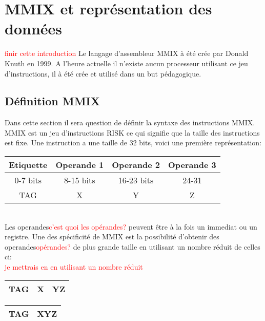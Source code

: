\documentclass {article}
\theoremstyle{definition}
\theoremstyle{remark}
\newcommand{\todo}[1]{\textcolor{red}{#1}}
\begin{document}
\section{MMIX et représentation des données}
\label{partieMMIX}

\todo{finir cette introduction}
Le langage d'assembleur MMIX à été crée par Donald Knuth en 1999.
A l'heure actuelle il n'existe aucun processeur utilisant ce jeu d'instructions, il
à été crée et utilisé dans un but pédagogique.



\subsection{Définition MMIX}

Dans cette section il sera question de définir la syntaxe des instructions MMIX.
MMIX est un jeu d'instructions RISK ce qui signifie que la taille des instructions
est fixe. Une instruction a une taille de 32 bits, voici une première représentation:

\begin{tabular}{|c|c|c|c|}
  \hline
  Etiquette & Operande 1 & Operande 2 & Operande 3\\
  \hline
  0-7 bits & 8-15 bits & 16-23 bits & 24-31  \\
  \hline
  TAG & X & Y & Z \\
  \hline
\end{tabular}
\\
Les operandes\todo{c'est quoi les opérandes?} peuvent être à la fois un immediat ou un registre.
Une des spécificité de MMIX est la possibilité d'obtenir des operandes\todo{opérandes?}
de plus grande taille en utilisant un nombre réduit de celles ci:\\\todo{je mettrais en en utilisant un nombre réduit}

\begin{tabular}{|c|c|c|}
  \hline 
  TAG & X & YZ \\
  \hline
\end{tabular}
\begin{tabular}{|c|c|}
  \hline 
  TAG & XYZ \\
  \hline
\end{tabular}
\end{document}
